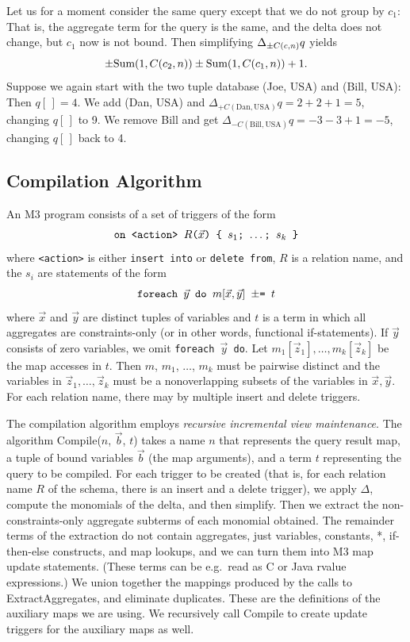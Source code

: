 \begin{example}
Let us for a moment consider the same query except that we do not group by
$c_1$: That is, the aggregate term for the query is the same, and the delta does not change, but $c_1$ now is not bound. Then simplifying $\Delta_{\pm C(c,n)} q$ yields
\[
\pm \mbox{Sum}(1, C(c_2, n)) \pm \mbox{Sum}(1, C(c_1,n)) + 1.
\]
Suppose we again start with the two tuple database (Joe, USA) and (Bill, USA):
Then $q[\,] = 4$. We add (Dan, USA) and
$\Delta_{+C(\mathrm{Dan}, \mathrm{USA})} q = 2 + 2 + 1 = 5$, changing
$q[\,]$ to 9. We remove Bill and get
$\Delta_{-C(\mathrm{Bill}, \mathrm{USA})} q = -3 - 3 + 1 = -5$, changing
$q[\,]$ back to 4.
\punto
\end{example}




\subsection{Compilation Algorithm}
\label{sec:compilation-alg}


An M3 program consists of a set of triggers of the form
\[
\mbox{{\tt on <action> $R$($\vec{x}$) \{ $s_1$; $\dots$; $s_k$ \}}}
\]
where {\tt <action>} is either {\tt insert into} or {\tt delete from},
$R$ is a relation name,
and the $s_i$ are statements of the form
\begin{equation}
\mbox{{\tt foreach $\vec{y}$ do $m[\vec{x}, \vec{y}]$ $\pm$= $t$}}
\end{equation}
where $\vec{x}$ and $\vec{y}$ are distinct tuples of variables and
$t$ is a term in which all aggregates are constraints-only (or in other
words, functional if-statements).
If $\vec{y}$ consists of zero variables, we omit
{\tt foreach $\vec{y}$ do}.
Let $m_1[\vec{z}_1], \dots, m_k[\vec{z}_k]$ be the map accesses in $t$.
Then $m$, $m_1$, $\dots$, $m_k$ must be pairwise distinct
and the variables in $\vec{z}_1, \dots, \vec{z}_k$ must be a nonoverlapping
subsets of the variables in $\vec{x}, \vec{y}$.
%
For each relation name, there may by multiple insert and delete triggers.


The compilation algorithm employs {\em recursive incremental view
maintenance}. The algorithm Compile($n$, $\vec{b}$, $t$) takes a name $n$ that
represents the query result map, a tuple of bound variables $\vec{b}$ (the map
arguments), and a term $t$ representing the query to be compiled.
For each trigger to be created (that is, for each relation name $R$ of
the schema, there is an insert and a delete trigger),
we apply $\Delta$, compute the monomials of the delta, and then simplify.
Then we extract the non-constraints-only aggregate
subterms of each monomial obtained.
The remainder terms of the extraction
do not contain aggregates, just variables, constants, *,
if-then-else constructs, and map lookups, and we can turn them into
M3 map update statements. (These terms can be e.g.\ read as C or Java rvalue
expressions.)
%
We union together the mappings produced by the calls to ExtractAggregates,
and eliminate duplicates. 
These are the definitions of the auxiliary maps we are using.
We recursively call Compile to create update triggers for the
auxiliary maps as well.


